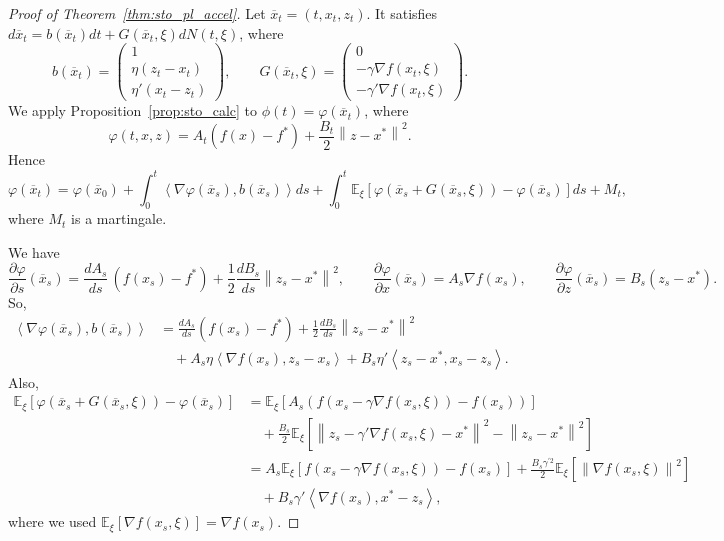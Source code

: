 \documentclass{article}
\newcommand{\norm}[1]{\left\lVert#1\right\rVert}
\newcommand{\dotprod}[1]{\left< #1\right>}
\theoremstyle{plain}
\theoremstyle{definition}
\theoremstyle{remark}
\begin{document}
\begin{proof}[Proof of Theorem~\ref{thm:sto_pl_accel}]
Let $\overline{x}_t= (t,x_t,z_t)$. It satisfies
$d\overline{x}_t = b(\overline{x}_t)dt + G(\overline{x}_t,\xi)dN(t,\xi)$, where
\[
b(\overline{x}_t) = \begin{pmatrix}
1 \\ \eta(z_t-x_t) \\ \eta'(x_t-z_t)
\end{pmatrix},
\qquad
G(\overline{x}_t,\xi) = \begin{pmatrix}
0 \\ -\gamma \nabla f(x_t,\xi) \\ -\gamma' \nabla f(x_t,\xi)
\end{pmatrix}.
\]
We apply Proposition~\ref{prop:sto_calc} to $\phi(t)= \varphi(\overline{x}_t)$, where
\[
\varphi(t,x,z) =  A_t(f(x)-f^\ast) + \frac{B_t}{2}\norm{z - x^\ast}^2.
\]
Hence
\begin{equation}\label{eq:prop_calc_sto}
\varphi(\overline{x}_t) = \varphi(\overline{x}_0)
+ \int_{0}^t \dotprod{\nabla \varphi(\overline{x}_s),b(\overline{x}_s)}ds
+ \int_{0}^t \mathbb{E}_{\xi}\!\left[ \varphi(\overline{x}_s + G(\overline{x}_s,\xi)) - \varphi(\overline{x}_s)\right]ds
+ M_t,
\end{equation}
where $M_t$ is a martingale.

We have
\[
\frac{\partial \varphi}{\partial s}(\overline{x}_s)
= \frac{dA_s}{ds}\,(f(x_s)-f^\ast) + \frac{1}{2}\frac{dB_s}{ds}\norm{z_s - x^\ast}^2,
\qquad
\frac{\partial \varphi}{\partial x}(\overline{x}_s) = A_s\nabla f(x_s),
\qquad
\frac{\partial \varphi}{\partial z}(\overline{x}_s) = B_s(z_s - x^\ast).
\]
So,
\begin{align}
\dotprod{\nabla \varphi(\overline{x}_s),b(\overline{x}_s)}
&=\frac{dA_s}{ds}(f(x_s)-f^\ast) + \frac{1}{2}\frac{dB_s}{ds}\norm{z_s - x^\ast}^2 \nonumber\\
&\quad + A_s \eta \dotprod{ \nabla f(x_s) ,z_s-x_s}+ B_s \eta' \dotprod{z_s-x^\ast,x_s - z_s}.
\label{eq:pl_sqc_eq_12}
\end{align}
Also,
\begin{align}
\mathbb{E}_{\xi}\!\left[\varphi(\overline{x}_s+ G(\overline{x}_s,\xi)) - \varphi(\overline{x}_s)\right]
&= \mathbb{E}_{\xi}\!\left[A_s(f(x_s - \gamma \nabla f(x_s,\xi)) - f(x_s))\right]\nonumber\\
&\quad + \frac{B_s}{2}\mathbb{E}_{\xi}\!\left[\norm{ z_s - \gamma'\nabla f(x_s,\xi) - x^\ast}^2 - \norm{z_s -x^\ast}^2\right]\nonumber\\
&= A_s\mathbb{E}_{\xi}\!\left[f(x_s - \gamma \nabla f(x_s,\xi)) - f(x_s)\right]
+ \frac{B_s \gamma^{'2}}{2}\mathbb{E}_{\xi}\!\left[\norm{\nabla f(x_s,\xi)}^2\right]\label{eq:pl_sqc_eq_3}\\
&\quad + B_s\gamma' \dotprod{\nabla f(x_s),x^\ast - z_s}, \label{eq:pl_sqc_eq_4}
\end{align}
where we used $\mathbb{E}_{\xi}[\nabla f(x_s,\xi)] = \nabla f(x_s)$.


\end{proof}
\end{document}
